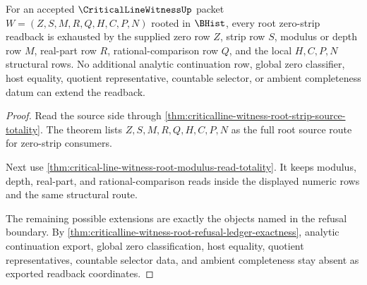 \begin{theorem}
\label{thm:critical-line-witness-root-zero-strip-readback}
For an accepted $\CriticalLineWitnessUp$ packet $W=(Z,S,M,R,Q,H,C,P,N)$ rooted in $\BHist$, every root zero-strip readback is exhausted by the supplied zero row $Z$, strip row $S$, modulus or depth row $M$, real-part row $R$, rational-comparison row $Q$, and the local $H,C,P,N$ structural rows. No additional analytic continuation row, global zero classifier, host equality, quotient representative, countable selector, or ambient completeness datum can extend the readback.
\end{theorem}
\begin{proof}
Read the source side through \autoref{thm:criticalline-witness-root-strip-source-totality}. The theorem lists $Z,S,M,R,Q,H,C,P,N$ as the full root source route for zero-strip consumers.

Next use \autoref{thm:critical-line-witness-root-modulus-read-totality}. It keeps modulus, depth, real-part, and rational-comparison reads inside the displayed numeric rows and the same structural route.

The remaining possible extensions are exactly the objects named in the refusal boundary. By \autoref{thm:criticalline-witness-root-refusal-ledger-exactness}, analytic continuation export, global zero classification, host equality, quotient representatives, countable selector data, and ambient completeness stay absent as exported readback coordinates.
\end{proof}

